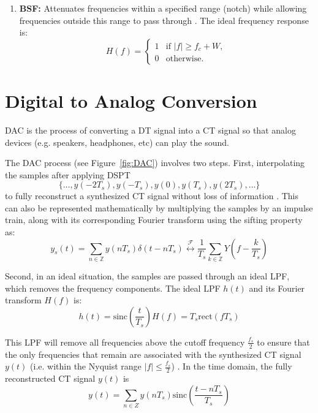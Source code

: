 \documentclass[12pt]{article}
\begin{document}
\begin{enumerate}
\item \textbf{BSF:} Attenuates frequencies within a specified range (notch) while allowing frequencies outside this range to pass through \cite{TTEM}. The ideal frequency response is:
\begin{equation}
    H(f) = 
    \begin{cases} 
    1 & \text{if } |f| \geq f_c + W, \\
    0 & \text{otherwise}.
    \end{cases}
\end{equation}
\end{enumerate}

\section{Digital to Analog Conversion}
DAC is the process of converting a DT signal into a CT signal so that analog devices (e.g. speakers, headphones, etc) can play the sound. 
\vspace{1em}

The DAC process (see Figure~\ref{fig:DAC}) involves two steps. First, interpolating the samples after applying DSPT
$$\{\ldots,y(-2T_s),y(-T_s),y(0),y(T_s),y(2T_s),\ldots\}$$
to fully reconstruct a synthesized CT signal without loss of information \cite{SO,FC}. This can also be represented mathematically by multiplying the samples by an impulse train, along with its corresponding Fourier transform using the sifting property as: 
\begin{equation}
    y_s(t) = \sum_{n \in \mathbb{Z}} y(nT_s) \delta(t - nT_s) \overset{\mathcal{F}}{\leftrightarrow} \frac{1}{T_s} \sum_{k \in \mathbb{Z}} Y \left(f - \frac{k}{T_s}\right)
\end{equation}

\vspace{1em}

Second, in an ideal situation, the samples are passed through an ideal LPF, which removes the frequency components. The ideal LPF $h(t)$ and its Fourier transform $H(f)$ is:
\begin{equation}
    h(t) = \text{sinc} \left(\frac{t}{T_s} \right)H(f) = T_s \text{rect} (fT_s) 
\end{equation}

This LPF will remove all frequencies above the cutoff frequency $\frac{f_s}{2}$ to ensure that the only frequencies that remain are associated with the synthesized CT signal $y(t)$ (i.e. within the Nyquist range \( |f| \leq \frac{f_s}{2} \)) \cite{SO}. In the time domain, the fully reconstructed CT signal $y(t)$ is 
\begin{equation}
    y(t) = \sum_{n \in Z} y(nT_s) \text{sinc} \left(\frac{t-nT_s}{T_s}\right)
\end{equation}
\end{document}
